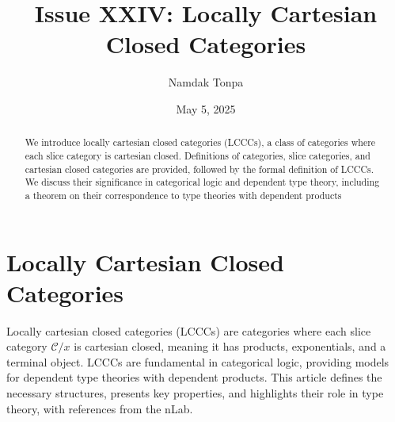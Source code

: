 \documentclass{article}
\theoremstyle{plain}
\theoremstyle{remark}
\begin{document}
\title{Issue XXIV: Locally Cartesian Closed Categories}
\author{Namdak Tonpa}
\date{May 5, 2025}

\maketitle

\begin{abstract}
We introduce locally cartesian closed categories (LCCCs), a class of categories where each slice category is cartesian closed. Definitions of categories, slice categories, and cartesian closed categories are provided, followed by the formal definition of LCCCs. We discuss their significance in categorical logic and dependent type theory, including a theorem on their correspondence to type theories with dependent products
\end{abstract}

\ifincludeTOC
  \tableofcontents
\fi

\section{Locally Cartesian Closed Categories}

Locally cartesian closed categories (LCCCs) are categories where each slice category $\mathcal{C}/x$ is cartesian closed, meaning it has products, exponentials, and a terminal object. LCCCs are fundamental in categorical logic, providing models for dependent type theories with dependent products. This article defines the necessary structures, presents key properties, and highlights their role in type theory, with references from the nLab.
\end{document}
